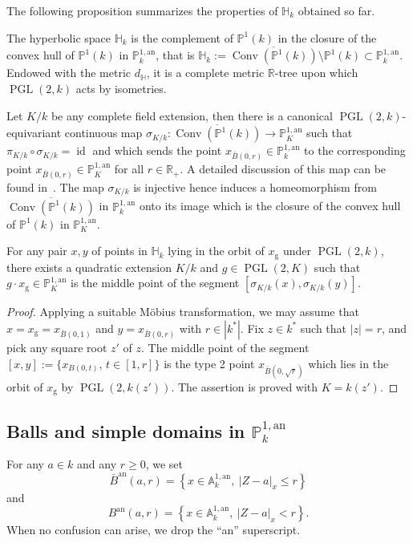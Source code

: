 \documentclass[AHL,Unicode,longabstracts]{cedram}
\DeclareMathOperator{\conv}{Conv}
\DeclareMathOperator{\id}{id}
\DeclareMathOperator{\PGL}{PGL}
\newcommand{\hh}{\mathbb{H}}
\newcommand{\A}{{\mathbb A}}
\newcommand{\R}{{\mathbb R}}
\newcommand{\an}{\mathrm{an}}
\newcommand{\set}[1]{\left\{#1\right\}}
\newcommand{\abs}[1]{\left\vert#1\right\vert}
\newcommand{\PP}{\mathbb{P}}
\newcommand{\PGLk}{\PGL(2, k)}
\begin{document}
The following proposition summarizes the properties of $\hh_k$ obtained so far.

\begin{prop}
The hyperbolic space $\hh_k$ is the complement of $\PP^1(k)$ in the closure of the convex hull of $\PP^1(k)$ in $\PP^{1,\an}_{k}$, that is $\hh_k:= \overline{\conv(\PP^1(k))}\setminus \PP^1(k)\subset \PP^{1,\an}_k$. Endowed with the metric $d_\hh$, it is a complete metric $\R$-tree upon which $\PGLk$ acts by isometries.
\end{prop}

Let $K/k$ be any complete field extension, then there is a canonical $\PGL(2,k)$-equivariant continuous map $\sigma_{K/k} : \overline{\conv(\PP^1(k))} \to \PP^{1,\an}_K$ such that $\pi_{K/k} \circ \sigma_{K/k} = \id$ and which sends the point $x_{\bar{B}(0,r)}\in\PP^{1,\an}_k$ to the corresponding point $x_{\bar{B}(0,r)}\in \PP^{1,\an}_K$ for all $r\in \R_+$. A detailed discussion of this map can be found in~\cite{poineau}. The map $\sigma_{K/k}$ is injective hence induces a homeomorphism from $\overline{\conv(\PP^1(k))}$ in $ \PP^{1,\an}_k$ onto its image which is the closure of the convex hull of $ \PP^1(k)$ in $ \PP^{1,\an}_K$.

\begin{prop}\label{prop:quadratic}
For any pair $x, y$ of points in $ \hh_k$ lying in the orbit of $x_{\mathrm{g}}$ under $\PGL(2,k)$, there exists a quadratic extension $K/k$ and $g\in \PGL(2,K)$ such that $g\cdot x_{\mathrm{g}}\in \PP^{1,\an}_K$ is the middle point of the segment $[\sigma_{K/k}(x),\sigma_{K/k}(y)]$.
\end{prop}

\begin{proof}
Applying a suitable M\"obius transformation, we may assume that $x= x_{\mathrm{g}} =x_{\bar{B}(0,1)}$ and $y = x_{\bar{B}(0,r)}$ with $r\in |k^*|$. Fix $z\in k^*$ such that $|z| = r$, and pick any square root $z'$ of $z$. The middle point of the segment $[x,y]:= \{x_{B(0,t)}, \, t \in [1,r]\}$ is the type 2 point $x_{\bar B(0, \sqrt{r})}$ which lies in the orbit of $x_{\mathrm{g}}$ by $\PGL(2,k(z'))$. The assertion is proved with $K=k(z')$.
\end{proof}

\subsection{Balls and simple domains in \texorpdfstring{$\PP^{1, \an}_k$}{PP1, ank}}

For any $a\in k$ and any $r\geq 0$, we set
\begin{equation}\label{eq:ball1}
\bar{B}^\an(a, r) = \set{x\in \A^{1, \an}_k, \ \abs{Z-a}_x \leq r}
\end{equation}
and
\begin{equation}\label{eq:ball2}
B^\an(a, r) = \set{x\in \A^{1, \an}_k, \ \abs{Z-a}_x < r}.
\end{equation}
When no confusion can arise, we drop the ``an'' superscript.
\end{document}
